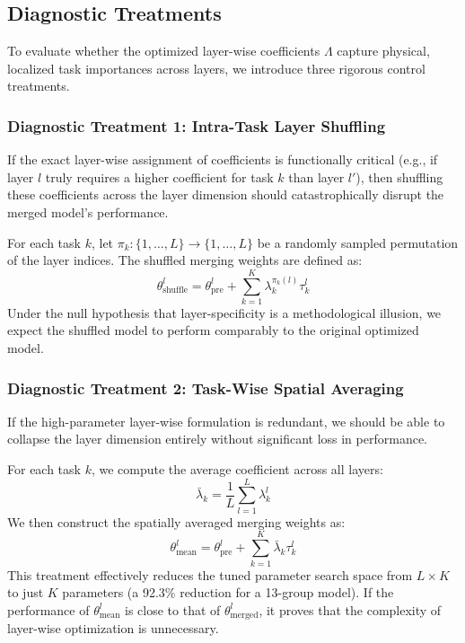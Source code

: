 \subsection{Diagnostic Treatments}
To evaluate whether the optimized layer-wise coefficients $\Lambda$ capture physical, localized task importances across layers, we introduce three rigorous control treatments.

\subsubsection{Diagnostic Treatment 1: Intra-Task Layer Shuffling}
If the exact layer-wise assignment of coefficients is functionally critical (e.g., if layer $l$ truly requires a higher coefficient for task $k$ than layer $l'$), then shuffling these coefficients across the layer dimension should catastrophically disrupt the merged model's performance. 

For each task $k$, let $\pi_k: \{1, \dots, L\} \to \{1, \dots, L\}$ be a randomly sampled permutation of the layer indices. The shuffled merging weights are defined as:
\begin{equation}
    \theta^l_{\text{shuffle}} = \theta^l_{\text{pre}} + \sum_{k=1}^K \lambda^{\pi_k(l)}_k \tau^l_k
\end{equation}
Under the null hypothesis that layer-specificity is a methodological illusion, we expect the shuffled model to perform comparably to the original optimized model.

\subsubsection{Diagnostic Treatment 2: Task-Wise Spatial Averaging}
If the high-parameter layer-wise formulation is redundant, we should be able to collapse the layer dimension entirely without significant loss in performance. 

For each task $k$, we compute the average coefficient across all layers:
\begin{equation}
    \bar{\lambda}_k = \frac{1}{L} \sum_{l=1}^L \lambda^l_k
\end{equation}
We then construct the spatially averaged merging weights as:
\begin{equation}
    \theta^l_{\text{mean}} = \theta^l_{\text{pre}} + \sum_{k=1}^K \bar{\lambda}_k \tau^l_k
\end{equation}
This treatment effectively reduces the tuned parameter search space from $L \times K$ to just $K$ parameters (a 92.3\% reduction for a 13-group model). If the performance of $\theta^l_{\text{mean}}$ is close to that of $\theta^l_{\text{merged}}$, it proves that the complexity of layer-wise optimization is unnecessary.

